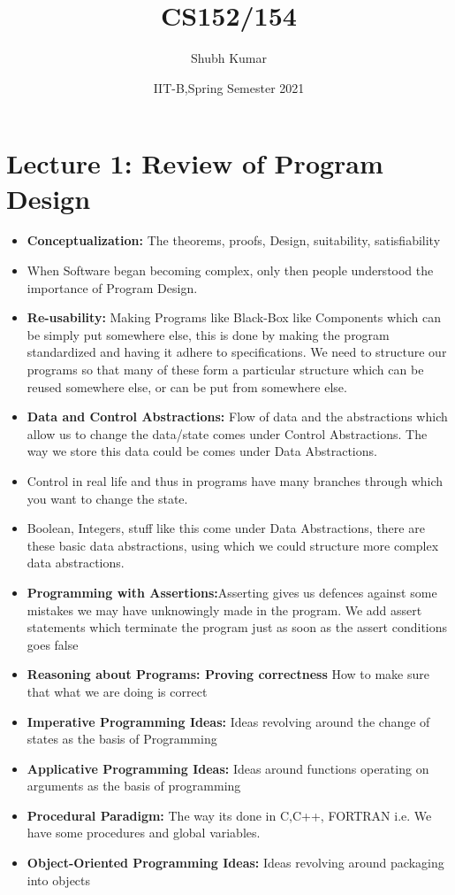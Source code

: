 \documentclass{article}
\title{\textbf{CS152/154}}
\author{Shubh Kumar}
\date{IIT-B,Spring Semester 2021}
\begin{document}
\maketitle

\section{Lecture 1: Review of Program Design}
\begin{itemize}
    \item \textbf{Conceptualization:} The theorems, proofs, Design, suitability, satisfiability
    \item When Software began becoming complex, only then people understood the importance of Program Design.
    \item \textbf{Re-usability:} Making Programs like Black-Box like Components which can be simply put somewhere else, this is done by making the program standardized and having it adhere to specifications. We need to structure our programs so that many of these form a particular structure which can be reused somewhere else, or can be put from somewhere else.
    \item \textbf{Data and Control Abstractions:} Flow of data and the abstractions which allow us to change the data/state comes under Control Abstractions. The way we store this data could be comes under Data Abstractions.
    \item Control in real life and thus in programs have many branches through which you want to change the state.
    \item Boolean, Integers, stuff like this come under Data Abstractions,
    there are these basic data abstractions, using which we could structure more complex data abstractions.
    \item \textbf{Programming with Assertions:}Asserting gives us defences against some mistakes we may have unknowingly made in the program. We add assert statements which terminate the program just as soon as the assert conditions goes false
    \item \textbf{Reasoning about Programs: Proving correctness} How to make sure that what we are doing is correct
    \item \textbf{Imperative Programming Ideas:} Ideas revolving around the change of states as the basis of Programming
    \item \textbf{Applicative Programming Ideas:} Ideas around functions operating on arguments as the basis of programming
    \item \textbf{Procedural Paradigm:} The way its done in C,C++, FORTRAN i.e. We have some procedures and global variables.
    \item \textbf{Object-Oriented Programming Ideas:} Ideas revolving around packaging into objects

\end{itemize}
\end{document}
